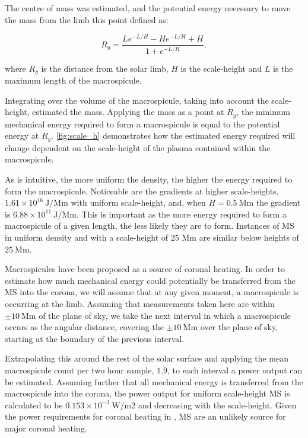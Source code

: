 The centre of mass was estimated, and the potential energy necessary to move the mass from the limb this point defined as:

\begin{equation}
R_y = \frac{Le^{-L/H} - He^{-L/H} + H}{1 + e^{-L/H}},
\end{equation} 

\noindent where $R_y$ is the distance from the solar limb, $H$ is the scale-height and $L$ is the maximum length of the macrospicule.

Integrating over the volume of the macrospicule, taking into account the scale-height, estimated the mass. Applying the mass as a point at $R_y$, the minimum mechanical energy required to form a macrospicule is equal to the potential energy at $R_y$. \cref{fig:scale_h} demonstrates how the estimated energy required will change dependent on the scale-height of the plasma contained within the macrospicule.

As is intuitive, the more uniform the density, the higher the energy required to form the macrospicule. Noticeable are the gradients at higher scale-heights, $1.61 \times 10^{16}\ \textrm{J/Mm}$ with uniform scale-height, and, when $H = 0.5\ \textrm{Mm}$ the gradient is  $6.88 \times 10^{11}\ \textrm{J/Mm}$. This is important as the more energy required to form a macrospicule of a given length, the less likely they are to form. Instances of MS in uniform density and with a scale-height of $25$ Mm are similar below heights of $25\ \textrm{Mm}$.

Macrospicules have been proposed as a source of coronal heating. In order to estimate how much mechanical energy could potentially be transferred from the MS into the corona, we will assume that at any given moment, a macrospicule is occurring at the limb. Assuming that measurements taken here are within $\pm10\ \textrm{Mm}$ of the plane of sky, we take the next interval in which a macrospicule occurs as the angular distance, covering the $\pm10\ \textrm{Mm}$ over the plane of sky, starting at the boundary of the previous interval. 

Extrapolating this around the rest of the solar surface and applying the mean macrospicule count per two hour sample, $1.9$, to each interval a power output can be estimated. Assuming further that all mechanical energy is transferred from the macrospicule into the corona, the power output for uniform scale-height MS is calculated to be $0.153 \times 10^{-3}\ \textrm{W/m{2}}$ and decreasing with the scale-height. Given the power requirements for coronal heating in \cite{AschwandenCHR2007}, MS are an unlikely source for major coronal heating.


